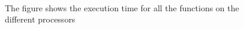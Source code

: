 \begin{figure}[h!] 
 \center 
  \\
 \caption{ The figure shows the execution time for all the functions on the different processors \label{fig:}}
 \end{figure}

\clearpage

























